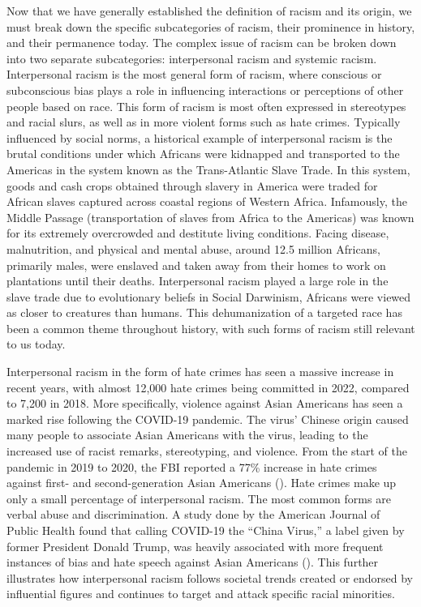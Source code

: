 Now that we have generally established the definition of racism and its origin, we must break down the specific subcategories of racism, their prominence in history, and their permanence today. The complex issue of racism can be broken down into two separate subcategories: interpersonal racism and systemic racism. Interpersonal racism is the most general form of racism, where conscious or subconscious bias plays a role in influencing interactions or perceptions of other people based on race. This form of racism is most often expressed in stereotypes and racial slurs, as well as in more violent forms such as hate crimes. Typically influenced by social norms, a historical example of interpersonal racism is the brutal conditions under which Africans were kidnapped and transported to the Americas in the system known as the Trans-Atlantic Slave Trade. In this system, goods and cash crops obtained through slavery in America were traded for African slaves captured across coastal regions of Western Africa. Infamously, the Middle Passage (transportation of slaves from Africa to the Americas) was known for its extremely overcrowded and destitute living conditions. Facing disease, malnutrition, and physical and mental abuse, around 12.5 million Africans, primarily males, were enslaved and taken away from their homes to work on plantations until their deaths. Interpersonal racism played a large role in the slave trade due to evolutionary beliefs in Social Darwinism, Africans were viewed as closer to creatures than humans. This dehumanization of a targeted race has been a common theme throughout history, with such forms of racism still relevant to us today. 

Interpersonal racism in the form of hate crimes has seen a massive increase in recent years, with almost 12,000 hate crimes being committed in 2022, compared to 7,200 in 2018. More specifically, violence against Asian Americans has seen a marked rise following the COVID-19 pandemic. The virus’ Chinese origin caused many people to associate Asian Americans with the virus, leading to the increased use of racist remarks, stereotyping, and violence. From the start of the pandemic in 2019 to 2020, the FBI reported a 77\% increase in hate crimes against first- and second-generation Asian Americans (\cite{findling2022}). Hate crimes make up only a small percentage of interpersonal racism. The most common forms are verbal abuse and discrimination. A study done by the American Journal of Public Health found that calling COVID-19 the “China Virus,” a label given by former President Donald Trump, was heavily associated with more frequent instances of bias and hate speech against Asian Americans (\cite{hswen2021}). This further illustrates how interpersonal racism follows societal trends created or endorsed by influential figures and continues to target and attack specific racial minorities. 

